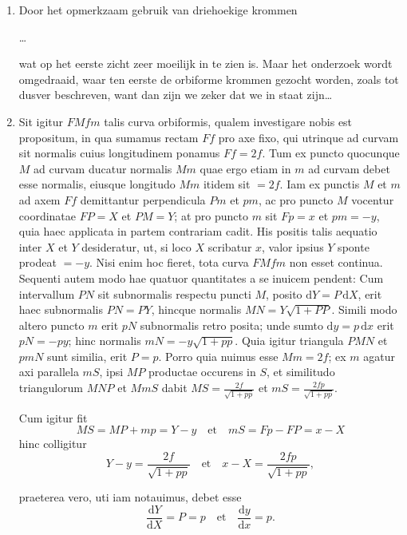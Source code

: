 \documentclass[10pt,a4paper]{article}
\newcommand{\switchenum}{\setcounter{enumi}{\arabic{enumi}-1}\switchcolumn}
\def\D{\mathrm{d}}
\begin{document}
\begin{paracol}{2}
\begin{enumerate}[topsep=1px]
		\switchenum
		\item Door het opmerkzaam gebruik van driehoekige krommen 
		\par \ldots
		\par wat op het eerste zicht zeer moeilijk in te zien is. Maar het onderzoek wordt omgedraaid, waar ten eerste de orbiforme krommen gezocht worden,  zoals tot dusver beschreven, want dan zijn we zeker dat we in staat zijn\ldots 
		
		\switchcolumn*
		
		\item Sit igitur $FMfm$ talis curva orbiformis, qualem investigare nobis est propositum, in qua sumamus rectam $Ff$ pro axe fixo, qui utrinque ad curvam sit normalis cuius longitudinem ponamus $Ff=2f$. Tum ex puncto quocunque $M$ ad curvam ducatur normalis $Mm$ quae ergo etiam in $m$ ad curvam debet esse normalis, eiusque longitudo $Mm$ itidem sit $=2f$. Iam ex punctis $M$ et $m$ ad axem $Ff$ demittantur perpendicula $Pm$ et $pm$, ac pro puncto $M$ vocentur coordinatae $FP=X$ et $PM=Y$; at pro puncto $m$ sit $Fp=x$ et $pm = -y$, quia haec applicata in partem contrariam cadit. His positis talis aequatio inter $X$ et $Y$ desideratur, ut, si loco $X$ scribatur $x$, valor ipsius $Y$ sponte prodeat $=-y$. Nisi enim hoc fieret, tota curva $FMfm$ non esset continua. Sequenti autem modo hae quatuor quantitates a se inuicem pendent: Cum intervallum $PN$ sit subnormalis respectu puncti $M$, posito $\D Y = P \,\D X$, erit haec subnormalis $PN=PY$, hincque normalis $MN=Y\sqrt{1+PP}$. Simili modo  altero puncto $m$ erit $pN$ subnormalis retro posita; unde sumto $\D y=p\,\D x$ erit $pN = -py$; hinc normalis $mN = -y\sqrt{1+pp}$. Quia igitur triangula $PMN$ et $pmN$ sunt similia, erit $P=p$. Porro quia nuimus esse $Mm=2f$; ex $m$ agatur axi parallela $mS$, ipsi $MP$ productae occurens in $S$, et similitudo triangulorum $MNP$ et $MmS$ dabit $MS = \frac{2f}{\sqrt{1+pp}}$ et $mS = \frac{2fp}{\sqrt{1+pp}}$.
		\par Cum igitur fit
		\[
			MS = MP + mp = Y-y  \quad \text{et} \quad mS = Fp-FP = x-X
		\]
		hinc colligitur
		\[
			Y-y = \frac{2f}{\sqrt{1+pp}} \quad \text{et}\quad x-X = \frac{2fp}{\sqrt{1+pp}},
		\]

		\par praeterea vero, uti iam notauimus, debet esse
		\[
			\frac{\D Y}{\D X} = P = p \quad \text{et} \quad \frac{\D y}{\D x} = p.
		\]
		

\end{enumerate}
\end{paracol}
\end{document}
